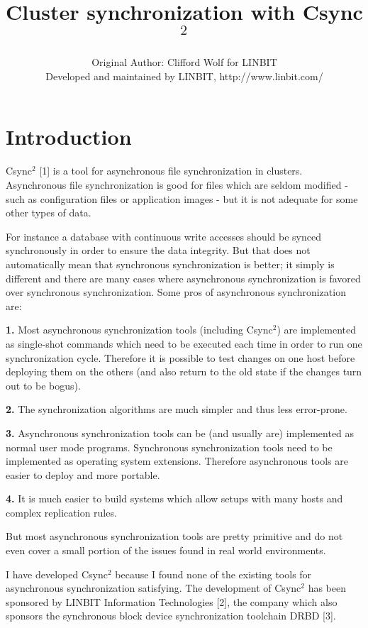 \documentclass[a4paper,twocolumn]{article}
\def\csync2{{\sc Csync$^{2}$}}
\begin{document}
\title{Cluster synchronization with \csync2}
\author{Original Author: Clifford Wolf for LINBIT\\
Developed and maintained by LINBIT, http://www.linbit.com/}
\maketitle

\section{Introduction}

\csync2 [1] is a tool for asynchronous file synchronization in clusters.
Asynchronous file synchronization is good for files which are seldom modified -
such as configuration files or application images - but it is not adequate for
some other types of data.

For instance a database with continuous write accesses should be synced
synchronously in order to ensure the data integrity. But that does not
automatically mean that synchronous synchronization is better; it simply is
different and there are many cases where asynchronous synchronization is
favored over synchronous synchronization. Some pros of asynchronous
synchronization are:

{\bf 1.}
Most asynchronous synchronization tools (including \csync2) are implemented as
single-shot commands which need to be executed each time in order to run one
synchronization cycle. Therefore it is possible to test changes on one host
before deploying them on the others (and also return to the old state if the
changes turn out to be bogus).

{\bf 2.}
The synchronization algorithms are much simpler and thus less error-prone.

{\bf 3.}
Asynchronous synchronization tools can be (and usually are) implemented as
normal user mode programs. Synchronous synchronization tools need to be
implemented as operating system extensions. Therefore asynchronous tools are
easier to deploy and more portable.

{\bf 4.}
It is much easier to build systems which allow setups with many hosts and
complex replication rules.

But most asynchronous synchronization tools are pretty primitive and do not
even cover a small portion of the issues found in real world environments.

I have developed \csync2 because I found none of the existing tools for
asynchronous synchronization satisfying. The development of \csync2 has
been sponsored by LINBIT Information Technologies [2], the company which also
sponsors the synchronous block device synchronization toolchain DRBD [3].
\end{document}
